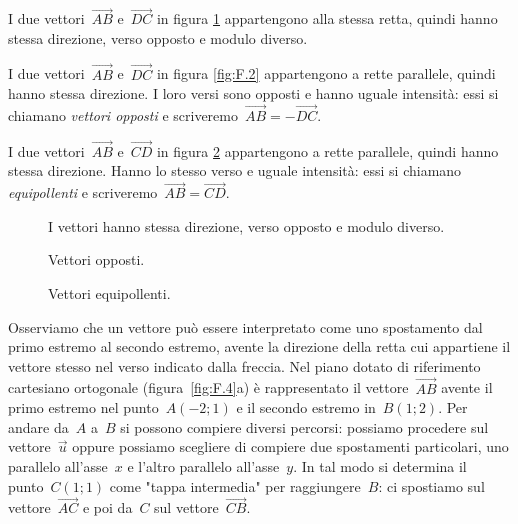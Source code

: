 \begin{exrig}
\begin{esempio}
I due vettori~$\overrightarrow{AB}$ e~$\overrightarrow{DC}$ in figura 
\ref{fig:F.1} appartengono alla stessa retta, quindi hanno stessa direzione, 
verso opposto e modulo diverso.
\end{esempio}

\begin{esempio}
I due vettori~$\overrightarrow{AB}$ e~$\overrightarrow{DC}$ in figura 
\ref{fig:F.2} appartengono a rette parallele, quindi hanno stessa direzione. I 
loro versi sono opposti e hanno
uguale intensità: essi si chiamano \emph{vettori opposti} e 
scriveremo~$\overrightarrow{AB}=-\overrightarrow{DC}$.
\end{esempio}
\begin{esempio}
I due vettori~$\overrightarrow{AB}$ e~$\overrightarrow{CD}$ in figura 
\ref{fig:F.3} appartengono a rette parallele, quindi hanno stessa direzione. 
Hanno lo stesso verso e uguale intensità:
essi si chiamano \emph{equipollenti} e 
scriveremo~$\overrightarrow{AB}=\overrightarrow{CD}$.
\end{esempio}
\end{exrig}

\begin{inaccessibleblock}
 \begin{figure}[b]
\centering

\caption{I vettori hanno stessa direzione, verso opposto e modulo 
diverso.}\label{fig:F.1}
\end{figure}
\end{inaccessibleblock}


 \begin{inaccessibleblock}
 \begin{figure}[t]
\begin{minipage}{0.45\textwidth}
\centering

\caption{Vettori opposti.}\label{fig:F.2}
\end{minipage}\hfil
\begin{minipage}{0.45\textwidth}
\centering

\caption{Vettori equipollenti.}\label{fig:F.3}
\end{minipage}
\end{figure}
\end{inaccessibleblock}

Osserviamo che un vettore può essere interpretato come uno spostamento dal 
primo estremo al secondo estremo, avente la direzione della retta cui appartiene 
il vettore stesso nel
verso indicato dalla freccia.
Nel piano dotato di riferimento cartesiano ortogonale (figura~\ref{fig:F.4}a) è 
rappresentato il vettore~$\overrightarrow{AB}$ avente il primo estremo nel 
punto~$A(-2;1)$ e
il secondo estremo
in~$B(1;2)$. Per andare da~$A$ a~$B$ si possono compiere diversi percorsi: 
possiamo procedere sul vettore~$\vec{u}$ oppure possiamo scegliere di compiere 
due spostamenti particolari,
uno parallelo all'asse~$x$ e l'altro parallelo all'asse~$y$. In tal modo si 
determina il punto~$C(1;1)$ come "tappa intermedia" per raggiungere~$B$:
ci spostiamo sul vettore~$\overrightarrow{AC}$ e poi da~$C$ sul 
vettore~$\overrightarrow{CB}$.

